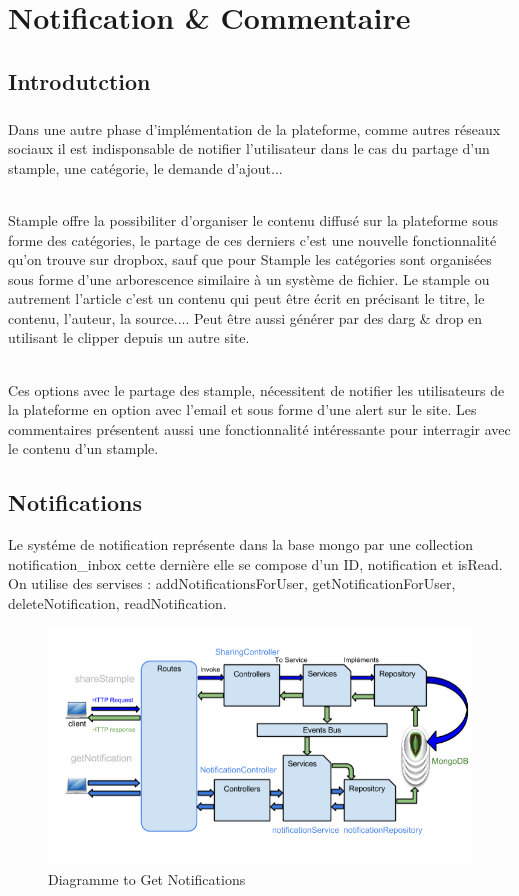 \chapter{Notification \& Commentaire\\}
\section{Introdutction}
\paragraph{}
Dans une autre phase d'implémentation de la plateforme, comme autres réseaux sociaux il est indisponsable de notifier l'utilisateur dans le cas du partage d'un stample, une catégorie, le demande d'ajout...
\subparagraph{}
Stample offre la possibiliter d'organiser le contenu diffusé sur la plateforme sous forme des catégories, le partage de ces derniers c'est une nouvelle fonctionnalité qu'on trouve sur dropbox, sauf que pour Stample les catégories sont organisées sous forme d'une arborescence similaire à un système de fichier.
\newline
Le stample ou autrement l'article c'est un contenu qui peut être écrit en précisant le titre, le contenu, l'auteur, la source....
Peut être aussi générer par des darg \& drop en utilisant le clipper depuis un autre site.
\subparagraph{}
Ces options avec le partage des stample, nécessitent de notifier les utilisateurs de la plateforme en option avec l'email et sous forme d'une alert sur le site.
\newline
Les commentaires présentent aussi une fonctionnalité intéressante pour interragir avec le contenu d'un stample.
\section{Notifications}
Le systéme de notification représente dans la base mongo par une collection notification\_inbox cette dernière elle se compose d'un ID, notification et isRead.
On utilise des servises : addNotificationsForUser, getNotificationForUser, deleteNotification, readNotification.
\begin{figure}[H]
        \centering
                \centering
                \includegraphics[width=\textwidth]{Notifications.png}
               \caption{Diagramme to Get Notifications}
		\label{fig:Diagramme to Get Notifications}
\end{figure}

